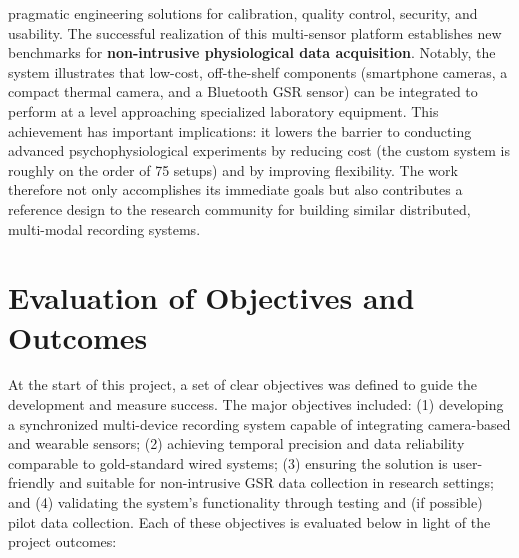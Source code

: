 pragmatic engineering solutions for calibration, quality control,
security, and usability. The successful realization of this multi-sensor
platform establishes new benchmarks for \textbf{non-intrusive physiological
data acquisition}. Notably, the system illustrates that low-cost,
off-the-shelf components (smartphone cameras, a compact thermal camera,
and a Bluetooth GSR sensor) can be integrated to perform at a level
approaching specialized laboratory equipment. This achievement has
important implications: it lowers the barrier to conducting advanced
psychophysiological experiments by reducing cost (the custom system is
roughly on the order of 75%
setups) and by improving flexibility. The work therefore not only
accomplishes its immediate goals but also contributes a reference design
to the research community for building similar distributed, multi-modal
recording systems.

\section{Evaluation of Objectives and Outcomes}

At the start of this project, a set of clear objectives was defined to
guide the development and measure success. The major objectives
included: (1) developing a synchronized multi-device recording system
capable of integrating camera-based and wearable sensors; (2) achieving
temporal precision and data reliability comparable to gold-standard
wired systems; (3) ensuring the solution is user-friendly and suitable
for non-intrusive GSR data collection in research settings; and (4)
validating the system's functionality through testing and (if possible)
pilot data collection. Each of these objectives is evaluated below in
light of the project outcomes:


